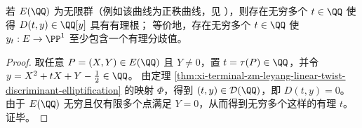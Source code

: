 \begin{corollary}[无穷多个有理参数产生有理分歧值]\label{cor:xi-terminal-zm-leyang-linear-twist-infinitely-many-rational-branch-values}
若 \(E(\QQ)\) 为无限群（例如该曲线为正秩曲线，见 \cite{LMFDBEllipticCurve37a1}），则存在无穷多个 \(t\in\QQ\) 使得 \(D(t,y)\in\QQ[y]\) 具有有理根；
等价地，存在无穷多个 \(t\in\QQ\) 使 \(y_t:E\to\PP^1\) 至少包含一个有理分歧值。
\end{corollary}
\begin{proof}
取任意 \(P=(X,Y)\in E(\QQ)\) 且 \(Y\neq 0\)，置 \(t=\tau(P)\in\QQ\)，并令 \(y=X^2+tX+Y-\tfrac12\in\QQ\)。
由定理 \ref{thm:xi-terminal-zm-leyang-linear-twist-discriminant-elliptification} 的映射 \(\Phi\)，得到 \((t,y)\in\mathcal D(\QQ)\)，即 \(D(t,y)=0\)。
由于 \(E(\QQ)\) 无穷且仅有限多个点满足 \(Y=0\)，从而得到无穷多个这样的有理 \(t\)。
证毕。
\end{proof}
